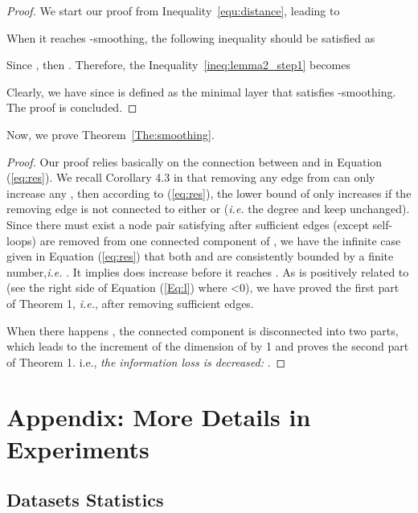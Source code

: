\documentclass{article}
\begin{document}
\begin{proof}
We start our proof from Inequality~\ref{equ:distance}, leading to

When it reaches -smoothing, the following inequality should be satisfied as

Since , then . Therefore, the Inequality~\ref{ineq:lemma2_step1} becomes

Clearly, we have  since  is defined as the minimal layer that satisfies -smoothing.
The proof is concluded.
\end{proof}



Now, we prove Theorem~\ref{The:smoothing}.
\begin{proof}
Our proof relies basically on the connection between  and  in Equation (\ref{eq:res}).
We recall Corollary 4.3 in \cite{Lovasz1993} that removing any edge from  can only increase any , then according to (\ref{eq:res}), the lower bound of   only increases if the removing edge is not connected to either  or  (\emph{i.e.} the degree  and  keep unchanged). 
Since there must exist a node pair satisfying  after sufficient edges (except self-loops) are removed from one connected component of , we have the infinite case  given in Equation (\ref{eq:res}) that both  and  are consistently bounded by a finite number,\emph{i.e.} . It implies  does increase before it reaches .  As  is positively related to  (see the right side of Equation (\ref{Eq:l}) where  <0), we have proved the first part of Theorem 1, \emph{i.e.}, {\em } after removing sufficient edges.

When there happens , the connected component is disconnected into two parts, which leads to the increment of the dimension of  by 1 and proves the second part of Theorem 1. i.e.,
{\em the information loss is decreased: }. 

\end{proof}


\newpage
\section{Appendix: More Details in Experiments}
\subsection{Datasets Statistics}
\end{document}
